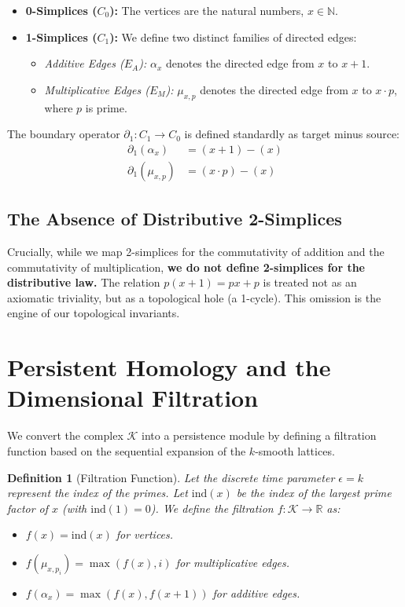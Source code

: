 \documentclass[11pt, a4paper]{article}
\newtheorem{definition}[theorem]{Definition}
\begin{document}
\begin{itemize}
    \item \textbf{0-Simplices ($C_0$):} The vertices are the natural numbers, $x \in \mathbb{N}$.
    \item \textbf{1-Simplices ($C_1$):} We define two distinct families of directed edges:
    \begin{itemize}
        \item \textit{Additive Edges ($E_A$):} $\alpha_x$ denotes the directed edge from $x$ to $x+1$.
        \item \textit{Multiplicative Edges ($E_M$):} $\mu_{x, p}$ denotes the directed edge from $x$ to $x \cdot p$, where $p$ is prime.
    \end{itemize}
\end{itemize}

The boundary operator $\partial_1 : C_1 \to C_0$ is defined standardly as target minus source:
\begin{align*}
\partial_1(\alpha_x) &= (x+1) - (x) \\
\partial_1(\mu_{x, p}) &= (x \cdot p) - (x)
\end{align*}

\subsection{The Absence of Distributive 2-Simplices}

Crucially, while we map 2-simplices for the commutativity of addition and the commutativity of multiplication, \textbf{we do not define 2-simplices for the distributive law.} The relation $p(x+1) = px + p$ is treated not as an axiomatic triviality, but as a topological hole (a 1-cycle). This omission is the engine of our topological invariants.

\section{Persistent Homology and the Dimensional Filtration}

We convert the complex $\mathcal{K}$ into a persistence module by defining a filtration function based on the sequential expansion of the $k$-smooth lattices.

\begin{definition}[Filtration Function]
Let the discrete time parameter $\epsilon = k$ represent the index of the primes. Let $\text{ind}(x)$ be the index of the largest prime factor of $x$ (with $\text{ind}(1)=0$). We define the filtration $f: \mathcal{K} \to \mathbb{R}$ as:
\begin{itemize}
    \item $f(x) = \text{ind}(x)$ for vertices.
    \item $f(\mu_{x, p_i}) = \max(f(x), i)$ for multiplicative edges.
    \item $f(\alpha_x) = \max(f(x), f(x+1))$ for additive edges.
\end{itemize}
\end{definition}
\end{document}
